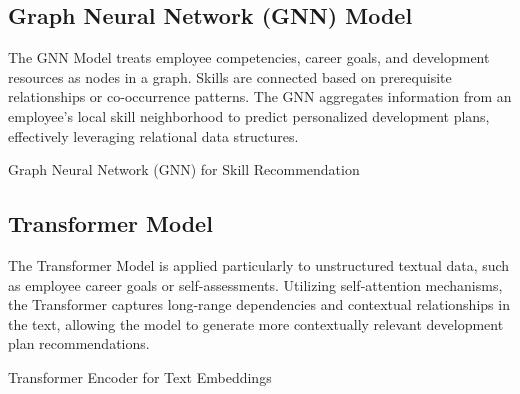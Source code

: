 \newpage
\subsection{Graph Neural Network (GNN) Model}
The GNN Model treats employee competencies, career goals, and development resources as nodes in a graph. Skills are connected based on prerequisite relationships or co-occurrence patterns. The GNN aggregates information from an employee’s local skill neighborhood to predict personalized development plans, effectively leveraging relational data structures.

\begin{algorithm}[H]
\DontPrintSemicolon
\caption{Graph Neural Network (GNN) for Skill Recommendation}
\label{alg:gnn}


\end{algorithm}

\subsection{Transformer Model}
The Transformer Model is applied particularly to unstructured textual data, such as employee career goals or self-assessments. Utilizing self-attention mechanisms, the Transformer captures long-range dependencies and contextual relationships in the text, allowing the model to generate more contextually relevant development plan recommendations.

\begin{algorithm}[H]
\DontPrintSemicolon
\caption{Transformer Encoder for Text Embeddings}
\label{alg:transformer}


\end{algorithm}
